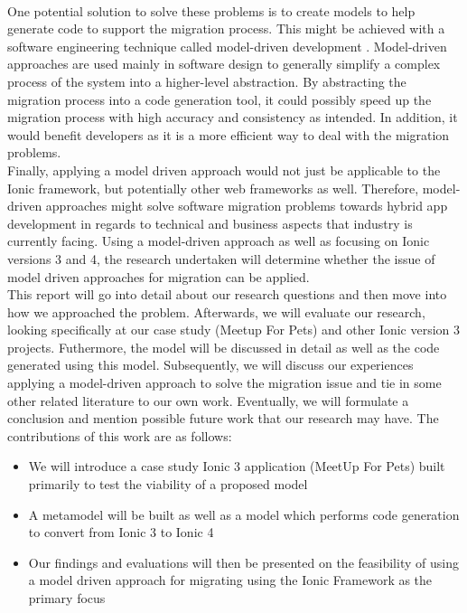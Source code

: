 \documentclass[conference]{IEEEtran}
\begin{document}
\\ One potential solution to solve these problems is to create models to help generate code to support the migration process.
This might be achieved with a software engineering technique called model-driven development \cite{b4}. Model-driven approaches are used mainly in software design to generally
simplify a complex process of the system into a higher-level abstraction. By abstracting the migration process into a code generation tool, it could possibly speed up the
migration process with high accuracy and consistency as intended. In addition, it would benefit developers as it is a more efficient way to deal with the migration problems.
\\ Finally, applying a model driven approach would not just be applicable to the Ionic framework, but potentially other web frameworks as well.
Therefore, model-driven approaches might solve software migration problems towards hybrid app development in regards to technical and business aspects
that industry is currently facing. Using a model-driven approach as well as focusing on Ionic versions 3 and 4, the research undertaken will determine whether
the issue of model driven approaches for migration can be applied.
\\ This report will go into detail about our research questions and then move into how we approached the problem. Afterwards, we will evaluate our research, looking specifically
at our case study (Meetup For Pets) and other Ionic version 3 projects. Futhermore, the model will be discussed in detail as well as the code generated using this model. Subsequently,  we will discuss our
experiences applying a model-driven approach to solve the migration issue and tie in some other related literature to our own work. Eventually, we will formulate a conclusion and mention possible
future work that our research may have.
\newline \newline The contributions of this work are as follows:
\begin{itemize}
    \item We will introduce a case study Ionic 3 application (MeetUp For Pets) built primarily to test the viability of a proposed model
    \item A metamodel will be built as well as a model which performs code generation to convert from Ionic 3 to Ionic 4
    \item Our findings and evaluations will then be presented on the feasibility of using a model driven approach for migrating using the Ionic Framework as the primary focus
\end{itemize}
\end{document}
